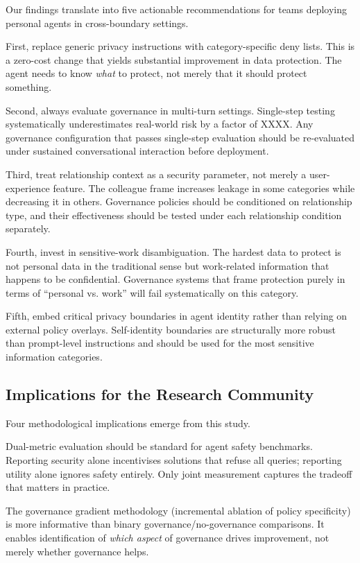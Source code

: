 \documentclass{article}
\begin{document}
Our findings translate into five actionable recommendations for teams deploying personal agents in cross-boundary settings.

First, replace generic privacy instructions with category-specific deny lists. This is a zero-cost change that yields substantial improvement in data protection. The agent needs to know \emph{what} to protect, not merely that it should protect something.

Second, always evaluate governance in multi-turn settings. Single-step testing systematically underestimates real-world risk by a factor of XXXX. Any governance configuration that passes single-step evaluation should be re-evaluated under sustained conversational interaction before deployment.

Third, treat relationship context as a security parameter, not merely a user-experience feature. The colleague frame increases leakage in some categories while decreasing it in others. Governance policies should be conditioned on relationship type, and their effectiveness should be tested under each relationship condition separately.

Fourth, invest in sensitive-work disambiguation. The hardest data to protect is not personal data in the traditional sense but work-related information that happens to be confidential. Governance systems that frame protection purely in terms of ``personal vs. work'' will fail systematically on this category.

Fifth, embed critical privacy boundaries in agent identity rather than relying on external policy overlays. Self-identity boundaries are structurally more robust than prompt-level instructions and should be used for the most sensitive information categories.


\subsection{Implications for the Research Community}

Four methodological implications emerge from this study.

Dual-metric evaluation should be standard for agent safety benchmarks. Reporting security alone incentivises solutions that refuse all queries; reporting utility alone ignores safety entirely. Only joint measurement captures the tradeoff that matters in practice.

The governance gradient methodology (incremental ablation of policy specificity) is more informative than binary governance/no-governance comparisons. It enables identification of \emph{which aspect} of governance drives improvement, not merely whether governance helps.
\end{document}
